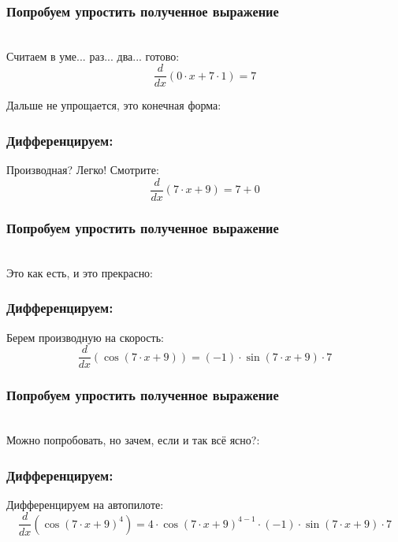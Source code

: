 \documentclass[a4paper,12pt]{article}
\begin{document}
\subsubsection*{Попробуем упростить полученное выражение}
\\Считаем в уме... раз... два... готово:\\
\begin{dmath}
	\frac{d}{dx}\left(0\cdot x+ 7\cdot 1\right) = 7\end{dmath}

Дальше не упрощается, это конечная форма:

\subsubsection*{Дифференцируем:}

Производная? Легко! Смотрите:
\begin{dmath}\frac{d}{dx}\left(7\cdot x+ 9\right)=7+ 0\end{dmath}
\subsubsection*{Попробуем упростить полученное выражение}
\\Это как есть, и это прекрасно:

\subsubsection*{Дифференцируем:}

Берем производную на скорость:
\begin{dmath}\frac{d}{dx}\left(\operatorname{cos}\left(7\cdot x+ 9\right) \right)=(-1)\cdot \operatorname{sin}\left(7\cdot x+ 9\right) \cdot 7\end{dmath}
\subsubsection*{Попробуем упростить полученное выражение}
\\Можно попробовать, но зачем, если и так всё ясно?:

\subsubsection*{Дифференцируем:}

Дифференцируем на автопилоте:
\begin{dmath}\frac{d}{dx}\left(\operatorname{cos}\left(7\cdot x+ 9\right) ^{4}\right)=4\cdot \operatorname{cos}\left(7\cdot x+ 9\right) ^{4- 1}\cdot (-1)\cdot \operatorname{sin}\left(7\cdot x+ 9\right) \cdot 7\end{dmath}
\end{document}
